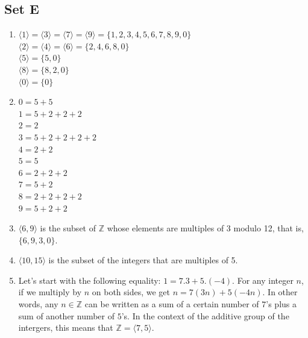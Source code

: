 \documentclass{article}
\newcommand{\angled}[1]{\langle#1\rangle}
\begin{document}
\subsection{Set E}
\begin{enumerate}
    \item 
        $\angled{1} = \angled{3} = \angled{7} = \angled{9} = \{1, 2, 3, 4, 5, 6, 7, 8, 9, 0\}$ \\
        $\angled{2} = \angled{4} = \angled{6} = \{2, 4, 6, 8, 0\}$ \\
        $\angled{5} = \{5, 0\}$ \\
        $\angled{8} = \{8, 2, 0\}$ \\
        $\angled{0} = \{0\}$ \\

    \item 
        $0 = 5 + 5$\\
        $1 = 5 + 2 + 2 + 2$\\
        $2 = 2$\\
        $3 = 5 + 2 + 2 + 2 + 2$\\
        $4 = 2 + 2$\\
        $5 = 5$\\
        $6 = 2 + 2 + 2$\\
        $7 = 5 + 2$\\
        $8 = 2 + 2 + 2 + 2$\\
        $9 = 5 + 2 + 2$\\

    \item $\angled{6, 9}$ is the subset of $\mathbb{Z}$ whose elements are multiples of 3 modulo 12, that is, $\{6, 9, 3, 0\}$.

    \item $\angled{10, 15}$ is the subset of the integers that are multiples of 5.

    \item Let's start with the following equality: $1 = 7.3 + 5.(-4)$. For any integer $n$, if we multiply by $n$ on both sides, we get $n = 7(3n) + 5(-4n)$. In other words, any $n \in \mathbb{Z}$ can be written as a sum of a certain number of $7$'s plus a sum of another number of $5$'s. In the context of the additive group of the intergers, this means that $\mathbb{Z} = \angled{7, 5}$.


\end{enumerate}
\end{document}
